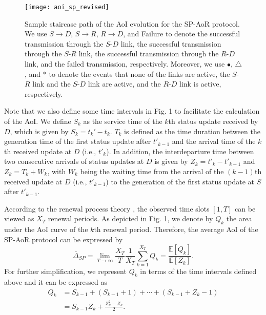 \documentclass{IEEEtran}
\begin{document}
\begin{figure}
	\centering
	\texttt{[image: aoi\_sp\_revised]}
	\vspace{-0.1cm}
	\caption{Sample staircase path of the AoI evolution for the SP-AoR protocol. We use $S\!\rightarrow\! D$, $S\!\rightarrow\! R$, $R\!\rightarrow\! D$, and Failure to denote the successful transmission through the $S$-$D$ link, the successful transmission through the $S$-$R$ link, the successful transmission through the $R$-$D$ link, and the failed transmission, respectively. Moreover, we use $\bullet$, {\scriptsize{$\triangle$}}, and $*$ to denote the events that none of the links are active, the $S$-$R$ link and the $S$-$D$ link are active, and the $R$-$D$ link is active, respectively.}
	\label{fig:aoisp}
	\vspace{-0.4cm}
\end{figure}

Note that we also define some time intervals in Fig. 1 to facilitate the calculation of the AoI. We define $S_k$ as the service time of the $k$th status update received by $D$, which is given by $S_k=t_k'-t_k$. $T_k$ is defined as the time duration between the generation time of the first status update after $t'_{k-1}$ and the arrival time of the $k$th received update at $D$ (i.e., $t'_k$). In addition, the interdeparture time between two consecutive arrivals of status updates at $D$ is given by $Z_k=t'_k-t'_{k-1}$ and $Z_k=T_k+W_k$, with $W_k$ being the waiting time from the arrival of the $(k-1)$th received update at $D$ (i.e., $t'_{k-1}$) to the generation of the first status update at $S$ after $t'_{k-1}$.



According to the renewal process theory \cite{b43}, the observed time slots $[1,T]$ can be viewed as $X_T$ renewal periods. As depicted in Fig. 1, we denote by $Q_k$ the area under the AoI curve of the $k$th renewal period. Therefore, the average AoI of the SP-AoR protocol can be expressed by
\begin{equation}\label{aoisp1}
	\bar{\Delta}_{SP}=\lim\limits_{T \to \infty }{\frac{X_{T}}{T}\frac{1}{X_{T}}\sum_{k=1}^{X_{T}}Q_{k}}=\frac{\mathbb{E}[Q_{k}]}{\mathbb{E}[Z_{k}]}.
\end{equation}For further simplification, we represent $Q_{k}$ in terms of the time intervals defined above and it can be expressed as
\begin{equation}\label{qksp}
\begin{aligned}
Q_{k}&=S_{k-1}+(S_{k-1}+1)+\cdots+(S_{k-1}+Z_{k}-1)\\
&=S_{k-1}Z_{k}+\frac{Z_{k}^2-Z_{k}}{2}.
\end{aligned}
\end{equation}
\end{document}
